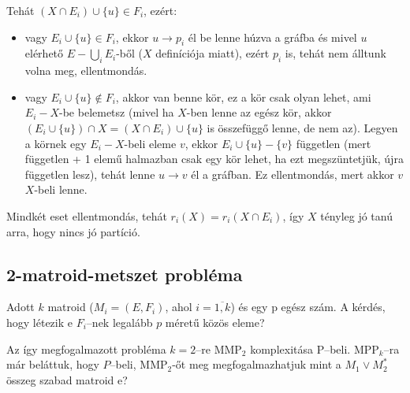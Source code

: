 Tehát $(X \cap E_i) \cup \{u\} \in F_i$, ezért:

\begin{itemize}
  \item vagy $E_i \cup \{u\} \in F_i$, ekkor $u \rightarrow p_i$ él be lenne
  húzva a gráfba és mivel $u$ elérhető $E - \bigcup_i E_i$-ből ($X$ definíciója
  miatt), ezért $p_i$ is, tehát nem álltunk volna meg, ellentmondás.
  \item vagy $E_i \cup \{u\} \not\in F_i$, akkor van benne kör, ez a kör csak
  olyan lehet, ami $E_i-X$-be belemetsz (mivel ha $X$-ben lenne az egész kör,
  akkor $(E_i \cup \{u\})\cap X = (X \cap E_i) \cup \{u\}$ is összefüggő lenne,
  de nem az). Legyen a körnek egy $E_i-X$-beli eleme $v$, ekkor $E_i \cup \{u\}
  - \{v\}$ független (mert független + 1 elemű halmazban csak egy kör lehet, ha
  ezt megszüntetjük, újra független lesz), tehát lenne $u \rightarrow v$ él a
  gráfban. Ez ellentmondás, mert akkor $v$ $X$-beli lenne.
\end{itemize}

Mindkét eset ellentmondás, tehát $r_i(X) = r_i(X \cap E_i)$, így $X$ tényleg jó
tanú arra, hogy nincs jó partíció.

\subsection{2-matroid-metszet probléma}

Adott $k$ matroid ($M_i=(E,F_i)$, ahol $i=\overline{1,k}$) és egy p egész szám.
A kérdés, hogy létezik e $F_i$--nek legalább $p$ méretű közös eleme?

Az így megfogalmazott probléma $k=2$--re MMP$_2$ komplexitása P--beli.
MPP$_k$--ra már beláttuk, hogy $P$--beli, MMP$_2$-őt meg megfogalmazhatjuk mint a
$M_1 \vee M_2^*$ összeg szabad matroid e?
